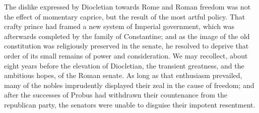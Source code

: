 The dislike expressed by Diocletian towards Rome and Roman
freedom was not the effect of momentary caprice, but the result
of the most artful policy. That crafty prince had framed a new
system of Imperial government, which was afterwards completed by
the family of Constantine; and as the image of the old
constitution was religiously preserved in the senate, he resolved
to deprive that order of its small remains of power and
consideration. We may recollect, about eight years before the
elevation of Diocletian, the transient greatness, and the
ambitious hopes, of the Roman senate. As long as that enthusiasm
prevailed, many of the nobles imprudently displayed their zeal in
the cause of freedom; and after the successes of Probus had
withdrawn their countenance from the republican party, the
senators were unable to disguise their impotent resentment.

